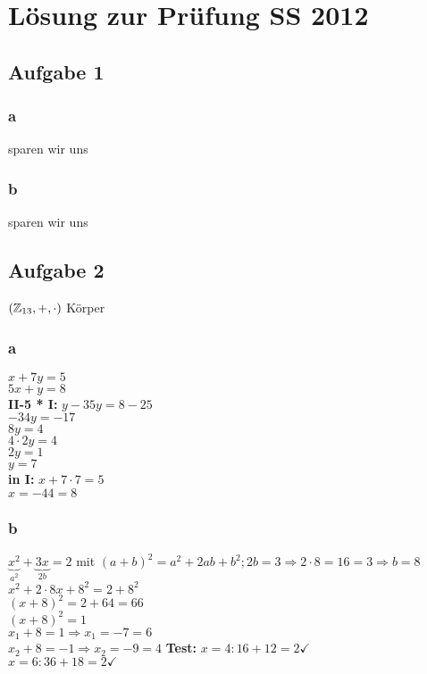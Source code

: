 \renewcommand{\ldate}{2015-06-15}	%

% 

\section{Lösung zur Prüfung SS 2012}

\subsection{Aufgabe 1}

\subsubsection{a}
	sparen wir uns
\subsubsection{b}
	sparen wir uns
	
\subsection{Aufgabe 2}
$(\mathbb{Z}_{13},+,\cdot)$ Körper

\subsubsection{a}
$x+7y=5$\\
$5x+y=8$\\
\textbf{II-5 * I:} $y-35y=8-25$\\
$-34y=-17$\\
$8y=4$\\
$4\cdot 2y=4$\\
$2y=1$\\
$y=7$\\
\textbf{in I:} $x+7\cdot 7=5$\\
$x=-44=8$

\subsubsection{b}
$\underbrace{x^2}_{a^2}+\underbrace{3x}_{2b}=2$ mit $(a+b)^2=a^2+2ab+b^2; 2b=3 \Rightarrow 2\cdot 8=16=3 \Rightarrow b=8$\\
$x^2+2\cdot 8x+8^2=2+8^2$\\
$(x+8)^2=2+64=66$\\
$(x+8)^2=1$\\
$x_1+8=1 \Rightarrow x_1=-7=6$\\
$x_2+8=-1 \Rightarrow x_2=-9=4$
\textbf{Test:} $x=4: 16+12=2 \checkmark$\\
$x=6: 36+18=2 \checkmark$

